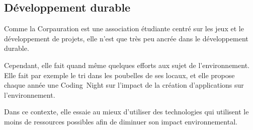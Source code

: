 \subsection{Développement durable}

Comme la Corpauration est une association étudiante centré sur les jeux et le développement de projets, elle n'est que très peu ancrée dans le développement durable.

Cependant, elle fait quand même quelques efforts aux sujet de l'environnement. Elle fait par exemple le tri dans les poubelles de ses locaux, et elle propose chaque année une Coding~Night sur l'impact de la création d'applications sur l'environnement.

Dans ce contexte, elle essaie au mieux d'utiliser des technologies qui utilisent le moins de ressources possibles afin de diminuer son impact environnemental.